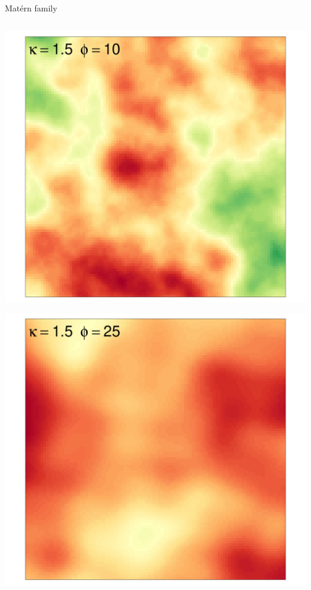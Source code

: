 \documentclass[
  ignorenonframetext,
]{beamer}
\begin{document}
\begin{frame}{Matérn family}
\begin{columns}[T]
\begin{column}{0.33\textwidth}
\includegraphics{Lecture_1_files/figure-beamer/unnamed-chunk-34-1.pdf}

\includegraphics{Lecture_1_files/figure-beamer/unnamed-chunk-35-1.pdf}
\end{column}


\end{columns}
\end{frame}
\end{document}
